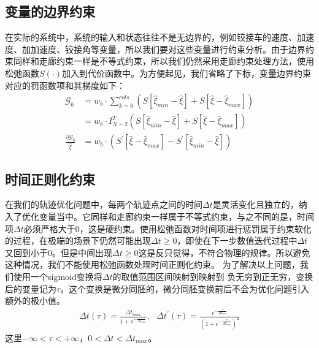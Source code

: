\documentclass[master,academic]{ysuthesis} %
\begin{document}
		\subsection{变量的边界约束}
		在实际的系统中，系统的输入和状态往往不是无边界的，例如铰接车的速度、加速度、加加速度、铰接角等变量，所以我们要对这些变量进行约束分析。由于边界约束同样和走廊约束一样是不等式约束，所以我们仍然采用走廊约束处理方法，使用松弛函数$S(\cdot)$加入到代价函数中。为方便起见，我们省略了下标，变量边界约束对应的罚函数项和其梯度如下：
		\begin{equation}
			\begin{aligned}
				\mathcal{G}_b&=w_b\cdot \sum_{k=0}^{cols}{\left( S\left[ \hat{\xi}_{min}-\hat{\xi} \right] +S\left[ \hat{\xi}-\hat{\xi}_{max} \right] \right)}\\
				&=w_b\cdot I_{N-2}^{T}\left( S\left[ \hat{\xi}_{min}-\hat{\xi} \right] +S\left[ \hat{\xi}-\hat{\xi}_{max} \right] \right)\\
				\frac{\partial \mathcal{G}_b}{\hat{\xi}}&=w_b\cdot \left( S^{'}\left[ \hat{\xi}-\hat{\xi}_{max} \right] -S^{'}\left[ \hat{\xi}_{min}-\hat{\xi} \right] \right)
			\end{aligned}
			\label{eq:Gb}
		\end{equation}

		\subsection{时间正则化约束}
		在我们的轨迹优化问题中，每两个轨迹点之间的时间$\Delta t$是灵活变化且独立的，纳入了优化变量当中。它同样和走廊约束一样属于不等式约束，与之不同的是，时间项$\Delta t$必须严格大于0，这是硬约束。使用松弛函数对时间项进行惩罚属于约束软化的过程，在极端的场景下仍然可能出现$\Delta t \ge 0$，即使在下一步数值迭代过程中$\Delta t$又回到小于0。但是中间出现$\Delta t \ge 0$这是反只觉得，不符合物理的规律。所以避免这种情况，我们不能使用松弛函数处理时间正则化约束。
		为了解决以上问题，我们使用一个sigmoid变换将$\Delta t$的取值范围区间映射到映射到 负无穷到正无穷，变换后的变量记为$\tau$。这个变换是微分同胚的，微分同胚变换前后不会为优化问题引入额外的极小值\cite{wang2022geometrically}。
		\begin{equation}
			\begin{aligned}
				\Delta t\left( \tau \right) =\frac{\Delta t_{max}}{1+e^{-\frac{\tau}{\Delta t_{max}}}},\,\,\,\,\Delta t^{'}\left( \tau \right) =\frac{e^{-\frac{\tau}{\Delta t_{max}}}}{\left( 1+e^{-\frac{\tau}{\Delta t_{max}}} \right) ^2}
			\end{aligned}
		\end{equation}
		这里$-\infty <\tau <+\infty $，$0<\Delta t<\Delta t_{max}$。
		
\end{document}
